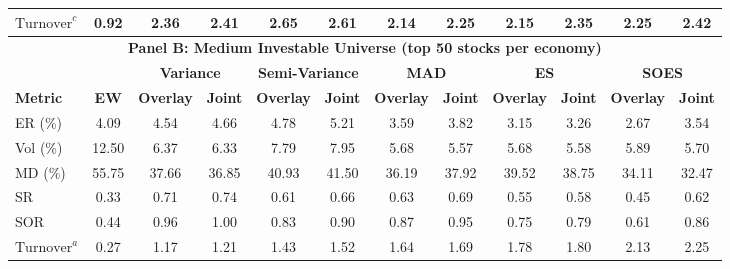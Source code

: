 \begin{table}[tbp]
{\begin{tabular}{l*{11}{c}}
    $\text{Turnover}^c$      & 0.92             & 2.36             & 2.41             & 2.65             & 2.61             & 2.14             & 2.25             & 2.15             & 2.35             & 2.25             & 2.42 \\
    \midrule
    \multicolumn{12}{c}{\textbf{Panel B: Medium Investable Universe (top 50 stocks per economy)}} \\
    \midrule
                             &                  & \multicolumn{2}{c}{\textbf{Variance}} & \multicolumn{2}{c}{\textbf{Semi-Variance}} & \multicolumn{2}{c}{\textbf{MAD}} & \multicolumn{2}{c}{\textbf{ES}} & \multicolumn{2}{c}{\textbf{SOES}} \\
    \cmidrule(lr){3-4} \cmidrule(lr){5-6} \cmidrule(lr){7-8} \cmidrule(lr){9-10} \cmidrule(lr){11-12}
    \textbf{Metric}          & \textbf{EW}      & \textbf{Overlay} & \textbf{Joint}   & \textbf{Overlay} & \textbf{Joint}   & \textbf{Overlay} & \textbf{Joint}   & \textbf{Overlay} & \textbf{Joint}   & \textbf{Overlay} & \textbf{Joint} \\
    \midrule
    ER (\%)                  & 4.09             & 4.54             & 4.66             & 4.78             & 5.21             & 3.59             & 3.82             & 3.15             & 3.26             & 2.67             & 3.54 \\
    Vol (\%)                 & 12.50            & 6.37             & 6.33             & 7.79             & 7.95             & 5.68             & 5.57             & 5.68             & 5.58             & 5.89             & 5.70 \\
    MD (\%)                  & 55.75            & 37.66            & 36.85            & 40.93            & 41.50            & 36.19            & 37.92            & 39.52            & 38.75            & 34.11            & 32.47 \\
    SR                       & 0.33             & 0.71             & 0.74             & 0.61             & 0.66             & 0.63             & 0.69             & 0.55             & 0.58             & 0.45             & 0.62 \\
    SOR                      & 0.44             & 0.96             & 1.00             & 0.83             & 0.90             & 0.87             & 0.95             & 0.75             & 0.79             & 0.61             & 0.86 \\
    $\text{Turnover}^a$      & 0.27             & 1.17             & 1.21             & 1.43             & 1.52             & 1.64             & 1.69             & 1.78             & 1.80             & 2.13             & 2.25 \\

\end{tabular}}
\end{table}
